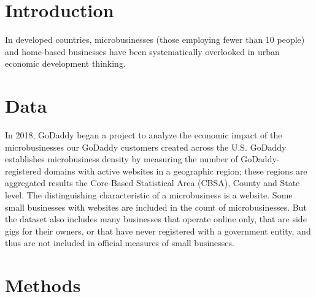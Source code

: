 \documentclass[
a4paper, %
12pt, %
]{CascadeAnalyticsWPS}
\begin{document}
	\newpage

\section{Introduction}
	
In developed countries, microbusinesses (those employing fewer than 10 people) and home-based businesses have been systematically overlooked in urban economic development thinking.
\section{Data}
In 2018, GoDaddy began a project to analyze the economic impact of the microbusinesses our GoDaddy customers created across the U.S. GoDaddy establishes microbusiness density by measuring the number of GoDaddy-registered domains with active websites in a geographic region; these regions are aggregated results the Core-Based Statistical Area (CBSA), County and State level. The distinguishing characteristic of a microbusiness is a website. Some small businesses with websites are included in the count of microbusinesses. But the dataset also includes many businesses that operate online only, that are side gigs for their owners, or that have never registered with a government entity, and thus are not included in official measures of small businesses.

\section{Methods}
\label{sec:sec3}
\end{document}

